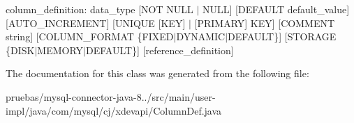 column\+\_\+definition\+: data\+\_\+type \mbox{[}N\+OT N\+U\+LL $\vert$ N\+U\+LL\mbox{]} \mbox{[}D\+E\+F\+A\+U\+LT default\+\_\+value\mbox{]} \mbox{[}A\+U\+T\+O\+\_\+\+I\+N\+C\+R\+E\+M\+E\+NT\mbox{]} \mbox{[}U\+N\+I\+Q\+UE \mbox{[}K\+EY\mbox{]} $\vert$ \mbox{[}P\+R\+I\+M\+A\+RY\mbox{]} K\+EY\mbox{]} \mbox{[}C\+O\+M\+M\+E\+NT \textquotesingle{}string\textquotesingle{}\mbox{]} \mbox{[}C\+O\+L\+U\+M\+N\+\_\+\+F\+O\+R\+M\+AT \{F\+I\+X\+E\+D$\vert$\+D\+Y\+N\+A\+M\+I\+C$\vert$\+D\+E\+F\+A\+U\+LT\}\mbox{]} \mbox{[}S\+T\+O\+R\+A\+GE \{D\+I\+S\+K$\vert$\+M\+E\+M\+O\+R\+Y$\vert$\+D\+E\+F\+A\+U\+LT\}\mbox{]} \mbox{[}reference\+\_\+definition\mbox{]} 

The documentation for this class was generated from the following file\+:\begin{DoxyCompactItemize}
\item 
pruebas/mysql-\/connector-\/java-\/8../src/main/user-\/impl/java/com/mysql/cj/xdevapi/Column\+Def.\+java\end{DoxyCompactItemize}
